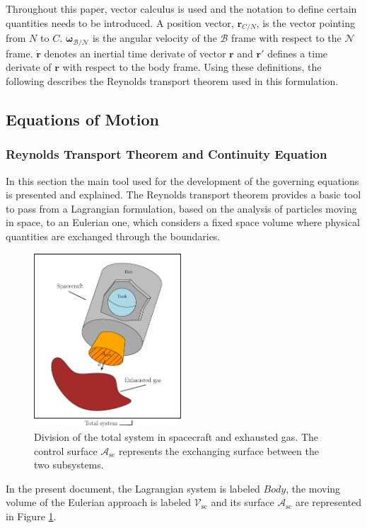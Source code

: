 	Throughout this paper, vector calculus is used and the notation to define certain quantities needs to be introduced. A position vector, $ \bm{r}_{C/N}$, is the vector pointing from $N$ to $C$. $\bm{\omega}_{\mathcal{B}/\mathcal{N}}$ is the angular velocity of the $\mathcal{B}$ frame with respect to the $\mathcal{N}$ frame.
	$\dot{\bm{r}}$ denotes an inertial time derivate of vector $\bm{r}$ and  $\bm{r}'$ defines a time derivate of $\bm{r}$ with respect to the body frame. Using these definitions, the following describes the Reynolds transport theorem used in this formulation.

\subsection{Equations of Motion}
\subsubsection{Reynolds Transport Theorem and Continuity Equation}
In this section the main tool used for the  development of the governing equations is presented and explained. The Reynolds transport theorem provides a basic tool to pass from a Lagrangian formulation, based on the analysis of particles moving in space, to an Eulerian one, which considers a fixed space volume where physical quantities are exchanged through the boundaries.
\begin{figure}[!htb]
	\centering
	\includegraphics[width=0.49\textwidth]{./Figures/DefSyst.eps}
	\caption{Division of the total system in spacecraft and exhausted gas. The control surface $\mathcal{A}_{\text{sc}}$ represents the exchanging surface between the two subsystems.}
	\label{fig:DefSyst}
\end{figure}
In the present document, the Lagrangian system is labeled $\textit{Body}$, the moving volume of the Eulerian approach is labeled $\mathcal{V}_{\text{sc}}$ and its surface $\mathcal{A}_{\text{sc}}$ are represented in Figure \ref{fig:DefSyst}.

